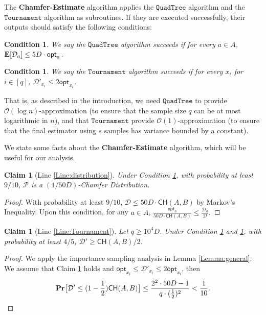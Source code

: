 \documentclass[11pt]{article}
\theoremstyle{plain}
\newtheorem{clm}[theorem]{Claim}
\newtheorem{cond}[theorem]{Condition}
\newcommand{\calP}{\mathcal{P}} \newcommand{\calD}{\mathcal{D}}
\newcommand{\OO}{\mathcal{O}}
\newcommand{\pr}[1]{\text{\bf Pr}\normalfont\bigl[ #1 \bigr]}
\newcommand{\e}[1]{\text{\bf E}\normalfont\lbrack #1 \rbrack}
\newcommand{\opt}{\mathsf{opt}}
\newcommand{\Tournament}{\texttt{Tournament}}
\newcommand{\QuadTree}{\texttt{QuadTree}} \usepackage{microtype}
\begin{document}
The \textbf{Chamfer-Estimate} algorithm applies the $\QuadTree$ algorithm and the $\Tournament$ algorithm as subroutines. If they are executed successfully, their outputs should satisfy the following conditions:


\begin{cond}\label{Condition:QuadTree}
    We say the $\QuadTree$ algorithm succeeds if for every $a \in A$, $\e{\calD_a} \leq 5{{D}} \cdot \opt_{a}$.
\end{cond}

\begin{cond}\label{Condition:Tournament}
    We say the $\Tournament$ algorithm succeeds if for every $x_i$ for $i \in [q]$, $\calD'_{x_i} \leq 2\opt_{x_i}$. 
\end{cond}

That is,  as described in the introduction, we need $\QuadTree$ to provide $\OO(\log n)$-approximation (to ensure that the sample size $q$ can be at most logarithmic in $n$), and that $\Tournament$ provide $\OO(1)$-approximation (to ensure that the final estimator using $s$ samples has variance bounded by a constant). 

We state some facts about the \textbf{Chamfer-Estimate} algorithm, which will be useful for our analysis. 



\begin{clm}[Line \ref{Line:distribution}]\label{Claim:P}
    Under Condition \ref{Condition:QuadTree}, with probability at least $9/10$, $\calP$ is a $(1/50{{D}})$-Chamfer Distribution.
\end{clm}

\begin{proof}
    With probability at least $9/10$, $\calD \leq 50{{D}}\cdot \mathsf{CH}(A, B)$ by Markov's Inequality. Upon this condition, for any $a \in A$,
    $\frac{\opt_{a}}{50{{D}}\cdot  \mathsf{CH}(A, B)} \leq \frac{\calD_a}{\calD}.$
\end{proof}

\begin{clm}[Line \ref{Line:Tournament}]\label{Claim:D'}       Let $q \geq 10^4 {{D}}$. Under Condition \ref{Condition:QuadTree} and \ref{Condition:Tournament}, with probability at least $4/5$, $\calD' \geq \mathsf{CH}(A, B)/2$. 
\end{clm}

\begin{proof}
    We apply the importance sampling analysis in Lemma \ref{Lemma:general}. We assume that Claim \ref{Claim:P} holds and $\opt_{x_i} \leq \calD'_{x_i} \leq 2\opt_{x_i}$, then
    \[\pr{\calD' \leq (1-\frac{1}{2})\mathsf{CH}(A, B)} \leq \frac{2^2\cdot 50{{D}} - 1}{q \cdot (\frac{1}{2})^2} <\frac{1}{10}.\]
\end{proof}
\end{document}
